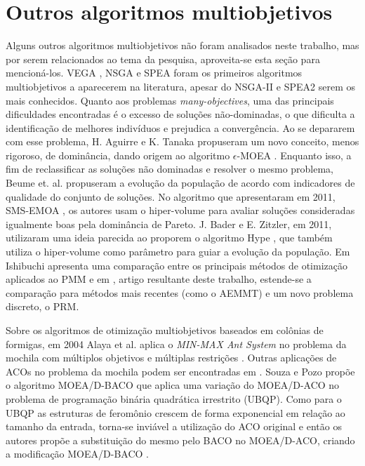 \section{Outros algoritmos multiobjetivos}
Alguns outros algoritmos multiobjetivos não foram analisados neste trabalho, mas por serem relacionados ao tema da pesquisa, aproveita-se esta seção para mencioná-los. \ac{VEGA} \cite{Schaffer1985}, \ac{NSGA} \cite{Srinivas1994} e \ac{SPEA} \cite{Zitzler1999} foram os primeiros algoritmos multiobjetivos a aparecerem na literatura, apesar do NSGA-II e SPEA2 serem os mais conhecidos. Quanto aos problemas \textit{many-objectives}, uma das principais dificuldades encontradas é o excesso de soluções não-dominadas, o que dificulta a identificação de melhores indivíduos e prejudica a convergência. Ao se depararem com esse problema, H. Aguirre e K. Tanaka propuseram um novo conceito, menos rigoroso, de dominância, dando origem ao algoritmo $\epsilon$-MOEA \cite{Aguirre2009}. Enquanto isso, a fim de reclassificar as soluções não dominadas e resolver o mesmo problema, Beume et. al. propuseram a evolução da população de acordo com indicadores de qualidade do conjunto de soluções. No algoritmo que apresentaram em 2011, SMS-EMOA \cite{Beume2007}, os autores usam o hiper-volume para avaliar soluções consideradas igualmente boas pela dominância de Pareto. J. Bader e E. Zitzler, em 2011, utilizaram uma ideia parecida ao proporem o algoritmo Hype \cite{Bader2011}, que também utiliza o hiper-volume como parâmetro para guiar a evolução da população. Em \cite{Ishibuchi2015} Ishibuchi apresenta uma comparação entre os principais métodos de otimização aplicados ao PMM e em \cite{Franca2017}, artigo resultante deste trabalho, estende-se a comparação para métodos mais recentes (como o AEMMT) e um novo problema discreto, o PRM.

Sobre os algoritmos de otimização multiobjetivos baseados em colônias de formigas, em 2004 Alaya et al. aplica o \textit{MIN-MAX Ant System} no problema da mochila com múltiplos objetivos e múltiplas restrições \cite{Alaya2004}. Outras aplicações de ACOs no problema da mochila podem ser encontradas em \cite{changdar2013,Ke2010,Fingler2014,kong2008,Fidanova2003}. Souza e Pozo propõe o algoritmo MOEA/D-BACO que aplica uma variação do MOEA/D-ACO no problema de programação binária quadrática irrestrito (UBQP). Como para o UBQP as estruturas de feromônio crescem de forma exponencial em relação ao tamanho da entrada, torna-se inviável a utilização do ACO original e então os autores propõe a substituição do mesmo pelo BACO no MOEA/D-ACO, criando a modificação MOEA/D-BACO \cite{SouzaPozo2015}.